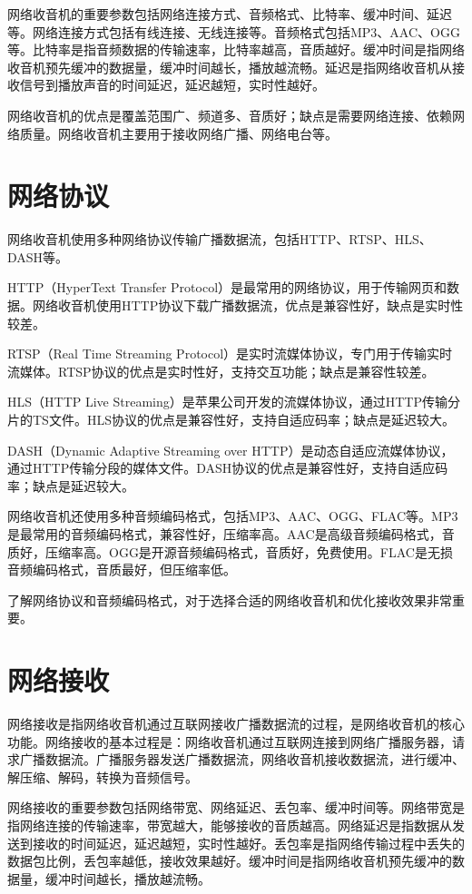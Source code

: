 \documentclass[12pt,UTF8]{ctexbook}
\begin{document}
网络收音机的重要参数包括网络连接方式、音频格式、比特率、缓冲时间、延迟等。网络连接方式包括有线连接、无线连接等。音频格式包括MP3、AAC、OGG等。比特率是指音频数据的传输速率，比特率越高，音质越好。缓冲时间是指网络收音机预先缓冲的数据量，缓冲时间越长，播放越流畅。延迟是指网络收音机从接收信号到播放声音的时间延迟，延迟越短，实时性越好。

网络收音机的优点是覆盖范围广、频道多、音质好；缺点是需要网络连接、依赖网络质量。网络收音机主要用于接收网络广播、网络电台等。

\section{网络协议}

网络收音机使用多种网络协议传输广播数据流，包括HTTP、RTSP、HLS、DASH等。

HTTP（HyperText Transfer Protocol）是最常用的网络协议，用于传输网页和数据。网络收音机使用HTTP协议下载广播数据流，优点是兼容性好，缺点是实时性较差。

RTSP（Real Time Streaming Protocol）是实时流媒体协议，专门用于传输实时流媒体。RTSP协议的优点是实时性好，支持交互功能；缺点是兼容性较差。

HLS（HTTP Live Streaming）是苹果公司开发的流媒体协议，通过HTTP传输分片的TS文件。HLS协议的优点是兼容性好，支持自适应码率；缺点是延迟较大。

DASH（Dynamic Adaptive Streaming over HTTP）是动态自适应流媒体协议，通过HTTP传输分段的媒体文件。DASH协议的优点是兼容性好，支持自适应码率；缺点是延迟较大。

网络收音机还使用多种音频编码格式，包括MP3、AAC、OGG、FLAC等。MP3是最常用的音频编码格式，兼容性好，压缩率高。AAC是高级音频编码格式，音质好，压缩率高。OGG是开源音频编码格式，音质好，免费使用。FLAC是无损音频编码格式，音质最好，但压缩率低。

了解网络协议和音频编码格式，对于选择合适的网络收音机和优化接收效果非常重要。

\section{网络接收}

网络接收是指网络收音机通过互联网接收广播数据流的过程，是网络收音机的核心功能。网络接收的基本过程是：网络收音机通过互联网连接到网络广播服务器，请求广播数据流。广播服务器发送广播数据流，网络收音机接收数据流，进行缓冲、解压缩、解码，转换为音频信号。

网络接收的重要参数包括网络带宽、网络延迟、丢包率、缓冲时间等。网络带宽是指网络连接的传输速率，带宽越大，能够接收的音质越高。网络延迟是指数据从发送到接收的时间延迟，延迟越短，实时性越好。丢包率是指网络传输过程中丢失的数据包比例，丢包率越低，接收效果越好。缓冲时间是指网络收音机预先缓冲的数据量，缓冲时间越长，播放越流畅。
\end{document}
